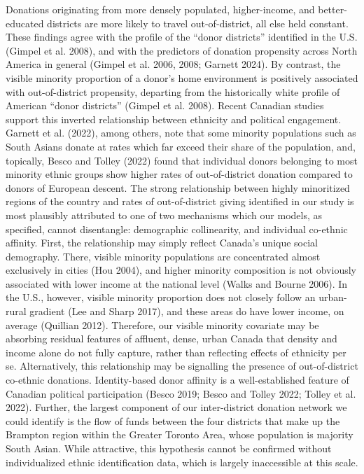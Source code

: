\documentclass[
  letterpaper,
  DIV=11,
  numbers=noendperiod]{scrartcl}
\begin{document}
Donations originating from more densely populated, higher-income, and
better-educated districts are more likely to travel out-of-district, all
else held constant. These findings agree with the profile of the ``donor
districts'' identified in the U.S. (Gimpel et al. 2008), and with the
predictors of donation propensity across North America in general
(Gimpel et al. 2006, 2008; Garnett 2024). By contrast, the visible
minority proportion of a donor's home environment is positively
associated with out-of-district propensity, departing from the
historically white profile of American ``donor districts'' (Gimpel et
al. 2008). Recent Canadian studies support this inverted relationship
between ethnicity and political engagement. Garnett et al. (2022), among
others, note that some minority populations such as South Asians donate
at rates which far exceed their share of the population, and, topically,
Besco and Tolley (2022) found that individual donors belonging to most
minority ethnic groups show higher rates of out-of-district donation
compared to donors of European descent. The strong relationship between
highly minoritized regions of the country and rates of out-of-district
giving identified in our study is most plausibly attributed to one of
two mechanisms which our models, as specified, cannot disentangle:
demographic collinearity, and individual co-ethnic affinity. First, the
relationship may simply reflect Canada's unique social demography.
There, visible minority populations are concentrated almost exclusively
in cities (Hou 2004), and higher minority composition is not obviously
associated with lower income at the national level (Walks and Bourne
2006). In the U.S., however, visible minority proportion does not
closely follow an urban-rural gradient (Lee and Sharp 2017), and these
areas do have lower income, on average (Quillian 2012). Therefore, our
visible minority covariate may be absorbing residual features of
affluent, dense, urban Canada that density and income alone do not fully
capture, rather than reflecting effects of ethnicity per se.
Alternatively, this relationship may be signalling the presence of
out-of-district co-ethnic donations. Identity-based donor affinity is a
well-established feature of Canadian political participation (Besco
2019; Besco and Tolley 2022; Tolley et al. 2022). Further, the largest
component of our inter-district donation network we could identify is
the flow of funds between the four districts that make up the Brampton
region within the Greater Toronto Area, whose population is majority
South Asian. While attractive, this hypothesis cannot be confirmed
without individualized ethnic identification data, which is largely
inaccessible at this scale.
\end{document}
